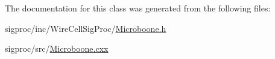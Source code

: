 The documentation for this class was generated from the following files\+:\begin{DoxyCompactItemize}
\item 
sigproc/inc/\+Wire\+Cell\+Sig\+Proc/\hyperlink{_microboone_8h}{Microboone.\+h}\item 
sigproc/src/\hyperlink{_microboone_8cxx}{Microboone.\+cxx}\end{DoxyCompactItemize}

